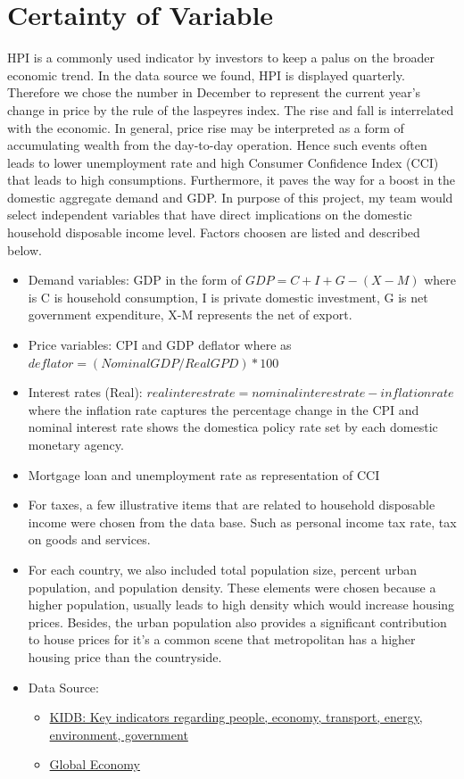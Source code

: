 \documentclass[11pt]{article}
\begin{document}
\section{Certainty of Variable}\label{section-Certainty}
HPI is a commonly used indicator by investors to keep a palus on the broader economic trend. In the data source we found, HPI is displayed quarterly. Therefore we chose the number in December to represent the current year's change in price by the rule of the laspeyres index. The rise and fall is interrelated with the economic. In general, price rise may be interpreted as a form of accumulating wealth from the day-to-day operation. Hence such events often leads to lower unemployment rate and high Consumer Confidence Index (CCI) that leads to high consumptions. Furthermore, it paves the way for a boost in the domestic aggregate demand and GDP\citep{aei297454}. In purpose of this project, my team would select independent variables that have direct implications on the domestic household disposable income level. Factors choosen are listed and described below. 
\begin{itemize}
\item Demand variables: GDP in the form of \(GDP = C + I + G - (X-M)\) where is C is household consumption, I is private domestic investment, G is net government expenditure, X-M represents the net of export. 
\item Price variables: CPI and GDP deflator where as \(deflator = (Nominal GDP / Real GPD) * 100 \)
\item Interest rates (Real): \(real interest rate = nominal interest rate - inflation rate\) where the inflation rate captures the percentage change in the CPI and nominal interest rate shows the domestica policy rate set by each domestic monetary agency. 
\item Mortgage loan and unemployment rate as representation of CCI
\item For taxes, a few illustrative items that are related to household disposable income were chosen from the data base. Such as personal income tax rate, tax on goods and services.
\item For each country, we also included total population size, percent urban population, and population density. These elements were chosen because a higher population, usually leads to high density which would increase housing prices. Besides, the urban population also provides a significant contribution to house prices for it's a common scene that metropolitan has a higher housing price than the countryside.
\item Data Source: 
    \begin{itemize}
        \item \href{https://kidb.adb.org/kidb/onlineQuery}{KIDB: Key indicators regarding people, economy, transport, energy, environment, government}
        \item \href{https://www.theglobaleconomy.com/}{Global Economy}
    \end{itemize}

\end{itemize}     
\end{document}
